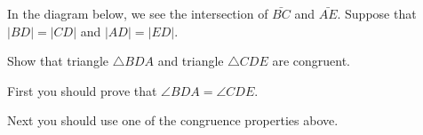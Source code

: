 \documentclass[noauthor,nooutcomes,12pt,hints,newpage,handout]{ximera}
\begin{document}
\begin{problem}\label{18} 
  In the diagram below, we see the intersection of $\bar{BC}$ and
  $\bar{AE}$. Suppose that $\left\vert BD\right\vert =\left\vert
  CD\right\vert $ and $\left\vert AD\right\vert =\left\vert
  ED\right\vert $.
  \begin{image}
  \end{image}

  
  Show that triangle $\triangle BDA$ and triangle $\triangle CDE$ are
  congruent.

  \begin{hint}
    First you should prove that  $\angle BDA = \angle CDE$.
  \end{hint}
  \begin{hint}
    Next you should use one of the congruence properties above. 
  \end{hint}
        
        
        
        

\end{problem}
\end{document}
